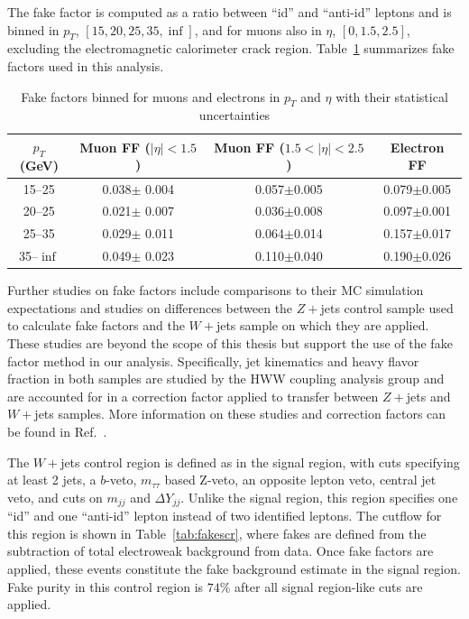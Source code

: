 The fake factor is computed as a ratio between ``id'' and ``anti-id'' leptons and is binned in $p_T$, $[15,20,25,35,\inf]$, and for muons also in $\eta$, $[0,1.5,2.5]$, excluding the electromagnetic calorimeter crack region. Table~\ref{tab:FakeFactors} summarizes fake factors used in this analysis.

\begin{table}[tb]
\centering
\begin{tabular}{c|c|c|c}
$p_T$(GeV) & Muon FF ($|\eta|<1.5$) & Muon FF ($1.5<|\eta|<2.5$) & Electron FF \\
\hline
15--25 & 0.038$\pm$ 0.004 & 0.057$\pm$0.005 & 0.079$\pm$0.005 \\
20--25 & 0.021$\pm$ 0.007 & 0.036$\pm$0.008 & 0.097$\pm$0.001 \\
25--35 & 0.029$\pm$ 0.011 & 0.064$\pm$0.014 & 0.157$\pm$0.017 \\
35--$\inf$ & 0.049$\pm$ 0.023 & 0.110$\pm$0.040 & 0.190$\pm$0.026 \\
\end{tabular}
\caption{Fake factors binned for muons and electrons in $p_T$ and $\eta$ with their statistical uncertainties}
\label{tab:FakeFactors}
\end{table}

Further studies on fake factors include comparisons to their MC simulation expectations and studies on differences between the $Z+$jets control sample used to calculate fake factors and the $W+$jets sample on which they are applied. These studies are beyond the scope of this thesis but support the use of the fake factor method in our analysis. Specifically, jet kinematics and heavy flavor fraction in both samples are studied by the HWW coupling analysis group and are accounted for in a correction factor applied to transfer between $Z+$jets and $W+$jets samples. More information on these studies and correction factors can be found in Ref.~\cite{Aaboud_2019}.

The $W+$jets control region is defined as in the signal region, with cuts specifying at least 2 jets, a $b$-veto, $m_{\tau\tau}$ based Z-veto, an opposite lepton veto, central jet veto, and cuts on $m_{jj}$ and $\Delta Y_{jj}$. Unlike the signal region, this region specifies one ``id'' and one ``anti-id'' lepton instead of two identified leptons. The cutflow for this region is shown in Table~\ref{tab:fakescr}, where fakes are defined from the subtraction of total electroweak background from data. Once fake factors are applied, these events constitute the fake background estimate in the signal region. Fake purity in this control region is $74\%$ after all signal region-like cuts are applied.

